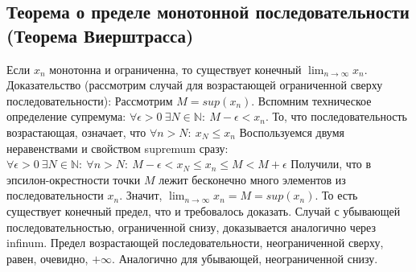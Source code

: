 \subsection{Теорема о пределе монотонной последовательности (Теорема Виерштрасса)}
    Если $x_n$ монотонна и ограниченна, то существует конечный $\lim_{n\to\infty}x_n$.
    \newline
    \newline
    Доказательство (рассмотрим случай для возрастающей ограниченной сверху последовательности):
    \newline
    Рассмотрим $M = sup(x_n)$. Вспомним техническое определение супремума:
    \newline
    $\forall \epsilon > 0 \ \exists N \in \mathbb{N} : \ M - \epsilon < x_n$.
    \newline
    То, что последовательность возрастающая, означает, что $\forall n > N : \ x_N \leq x_n$
    \newline
    Воспользуемся двумя неравенствами и свойством supremum сразу:
    \newline
    $\forall \epsilon > 0 \ \exists N \in \mathbb{N} : \ \forall n > N : \ M - \epsilon < x_N \leq x_n \leq M < M + \epsilon$
    \newline
    Получили, что в эпсилон-окрестности точки $M$ лежит бесконечно много элементов из последовательности $x_n$. Значит, $\lim_{n\to\infty}x_n = M = sup(x_n)$. То есть существует конечный предел, что и требовалось доказать.
    \newline
    \newline
    Случай с убывающей последовательностью, ограниченной снизу, доказывается аналогично через infinum.
    \newline
    Предел возрастающей последовательности, неограниченной сверху, равен, очевидно, $+\infty$. Аналогично для убывающей, неограниченной снизу.
    
\newpage
